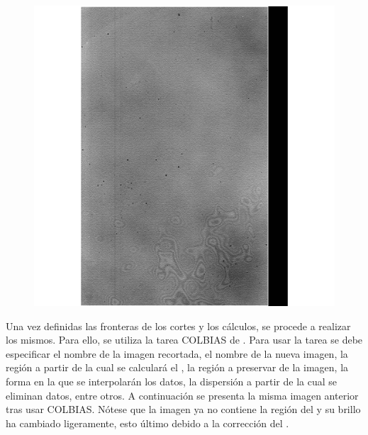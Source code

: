 \documentclass[12pt]{article}
\begin{document}
\begin{figure}[H]
  \centering
   \includegraphics[scale= 0.5]{im02.png}
  \label{im02}
\end{figure}


Una vez definidas las fronteras de los cortes y los cálculos, se procede a realizar los mismos. Para ello, se utiliza la tarea COLBIAS de  . Para usar la tarea se debe especificar el nombre de la imagen recortada, el nombre de la nueva imagen, la región a partir de la cual se calculará el , la región a preservar de la imagen, la forma en la que se interpolarán los datos, la dispersión a partir de la cual se eliminan datos, entre otros. A continuación se presenta la misma imagen anterior tras usar COLBIAS. Nótese que la imagen ya no contiene la región del  y su brillo ha cambiado ligeramente, esto último debido a la corrección del .
\end{document}
